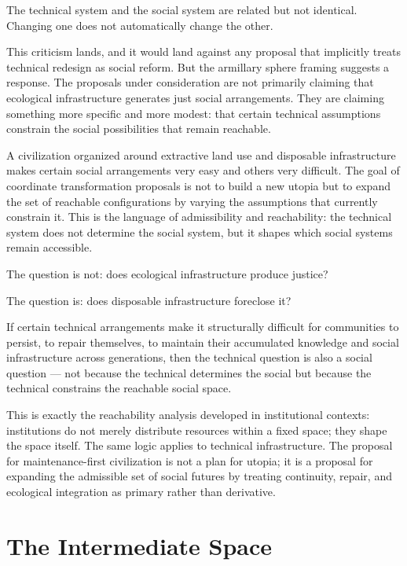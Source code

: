 \documentclass[12pt, a4paper]{article}
\theoremstyle{named}
\begin{document}
The technical system and the social system are related but not identical.
Changing one does not automatically change the other.

This criticism lands, and it would land against any proposal that
implicitly treats technical redesign as social reform. But the armillary
sphere framing suggests a response. The proposals under consideration
are not primarily claiming that ecological infrastructure generates just
social arrangements. They are claiming something more specific and more
modest: that certain technical assumptions constrain the social
possibilities that remain reachable.

A civilization organized around extractive land use and disposable
infrastructure makes certain social arrangements very easy and others
very difficult. The goal of coordinate transformation proposals is not
to build a new utopia but to expand the set of reachable configurations
by varying the assumptions that currently constrain it. This is the
language of admissibility and reachability: the technical system does
not determine the social system, but it shapes which social systems
remain accessible.

\begin{keybox}
The question is not: does ecological infrastructure produce justice?

The question is: does disposable infrastructure foreclose it?
\end{keybox}

If certain technical arrangements make it structurally difficult for
communities to persist, to repair themselves, to maintain their
accumulated knowledge and social infrastructure across generations, then
the technical question is also a social question — not because the
technical determines the social but because the technical constrains the
reachable social space.

This is exactly the reachability analysis developed in institutional
contexts: institutions do not merely distribute resources within a fixed
space; they shape the space itself. The same logic applies to technical
infrastructure. The proposal for maintenance-first civilization is not
a plan for utopia; it is a proposal for expanding the admissible set of
social futures by treating continuity, repair, and ecological integration
as primary rather than derivative.

\section{The Intermediate Space}
\end{document}

